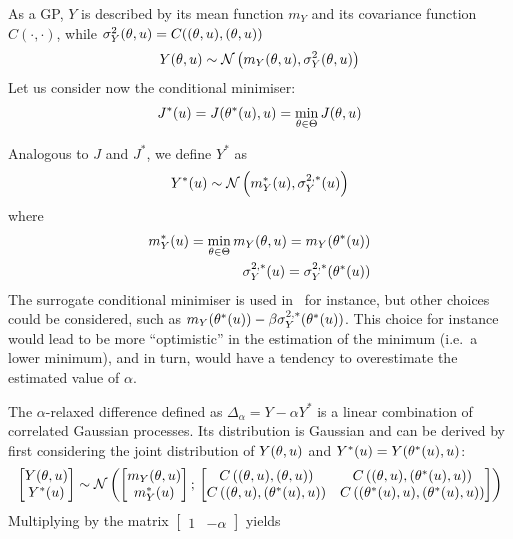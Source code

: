 \documentclass[../../Main_ManuscritThese.tex]{subfiles}
\begin{document}
As a GP, $Y$ is described by its mean function $m_{Y}$ and its covariance function $C(\cdot, \cdot)$, while $\sigma^2_Y(\theta,u) = C((\theta,u), (\theta,u))$
\begin{equation}
  Y(\theta,u) \sim \mathcal{N}\left(m_{Y}(\theta,u), \sigma^2_Y(\theta,u) \right)
\end{equation}
Let us consider now the conditional minimiser:
\begin{align}
  J^*(u) = J(\theta^*(u),u) = \min_{\theta\in\Theta} J(\theta,u)
\end{align}

Analogous to $J$ and $J^*$, we define $Y^*$ as
\begin{equation}
  Y^*(u) \sim \mathcal{N}\left(m^*_Y(u), \sigma^{2,*}_Y(u)\right)
\end{equation}
where
\begin{align}
  m^*_Y(u) = \min_{\theta\in\Theta} m_Y(\theta,u) = m_Y(\theta^*(u)) \\
  \sigma^{2,*}_Y(u) = \sigma^{2,*}_Y(\theta^*(u)) 
\end{align}
The surrogate conditional minimiser is used in~\cite{ginsbourger_bayesian_2014} for instance, but other choices could be considered, such as $m_Y(\theta^*(u)) - \beta \sigma^{2,*}_Y(\theta^*(u))$. This choice for instance would lead to be more ``optimistic'' in the estimation of the minimum (i.e.\ a lower minimum), and in turn, would have a tendency to overestimate the estimated value of $\alpha$.

The $\alpha$-relaxed difference defined as  $\Delta_{\alpha} = Y - \alpha Y^*$ is a linear combination of correlated Gaussian processes. Its distribution is Gaussian and can be derived by first considering the joint distribution of $Y(\theta,u)$ and $Y^*(u) = Y(\theta^*(u), u)$:
\begin{equation}
  \begin{bmatrix}
    Y(\theta,u) \\
    Y^*(u)
  \end{bmatrix}
  \sim \mathcal{N}\left(
    \begin{bmatrix}
      m_Y(\theta,u) \\
      m_Y^*(u)
    \end{bmatrix}
    ;\,
    \begin{bmatrix}
      C\left((\theta,u),(\theta,u)\right) & C\left((\theta,u),(\theta^*(u),u)\right) \\
      C\left((\theta,u),(\theta^*(u),u)\right) & C\left((\theta^*(u),u),(\theta^*(u),u)\right)
    \end{bmatrix}
\right)
\end{equation}
Multiplying by the matrix $\begin{bmatrix}1 & -\alpha \end{bmatrix}$ yields
\end{document}
